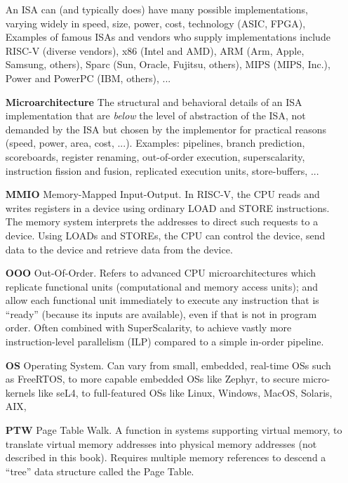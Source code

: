 \begin{itemize}
  An ISA can (and typically does) have many possible implementations,
  varying widely in speed, size, power, cost, technology (ASIC, FPGA),
  {\etc} Examples of famous ISAs and vendors who supply
  implementations include RISC-V (diverse vendors), x86 (Intel and
  AMD), ARM (Arm, Apple, Samsung, others), Sparc (Sun, Oracle,
  Fujitsu, others), MIPS (MIPS, Inc.), Power and PowerPC (IBM,
  others), ...

\item[\bf Microarchitecture] The structural and behavioral details of
  an ISA implementation that are \emph{below} the level of abstraction
  of the ISA, {\ie} not demanded by the ISA but chosen by the
  implementor for practical reasons (speed, power, area, cost, ...).
  Examples: pipelines, branch prediction, scoreboards, register
  renaming, out-of-order execution, superscalarity, instruction
  fission and fusion, replicated execution units, store-buffers, ...

\item[\bf MMIO] Memory-Mapped Input-Output.  In RISC-V, the CPU reads
  and writes registers in a device using ordinary LOAD and STORE
  instructions.  The memory system interprets the addresses to direct
  such requests to a device.  Using LOADs and STOREs, the CPU can
  control the device, send data to the device and retrieve data from
  the device.

\item[\bf OOO] Out-Of-Order.  Refers to advanced CPU
  microarchitectures which replicate functional units (computational
  and memory access units); and allow each functional unit immediately
  to execute any instruction that is ``ready'' (because its inputs are
  available), even if that is not in program order.  Often combined
  with SuperScalarity, to achieve vastly more instruction-level
  parallelism (ILP) compared to a simple in-order pipeline.

\item[\bf OS] Operating System.  Can vary from small, embedded,
  real-time OSs such as FreeRTOS, to more capable embedded OSs like
  Zephyr, to secure micro-kernels like seL4, to full-featured OSs like
  Linux, Windows, MacOS, Solaris, AIX, {\etc}

\item[\bf PTW] Page Table Walk.  A function in systems supporting
  virtual memory, to translate virtual memory addresses into physical
  memory addresses (not described in this book).  Requires multiple
  memory references to descend a ``tree'' data structure called the
  Page Table.


\end{itemize}
